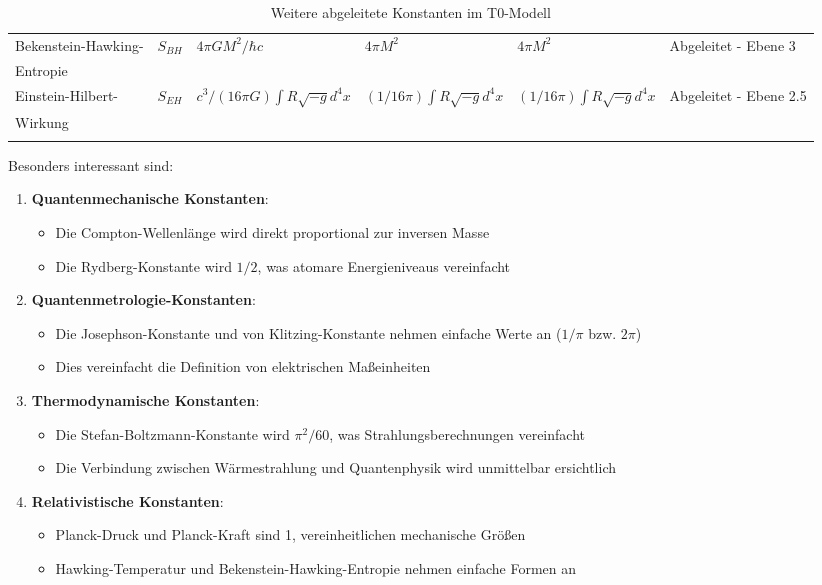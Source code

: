 \documentclass[12pt,a4paper]{article}
\begin{document}
\begin{table}[ht]
\begin{adjustbox}{scale=0.65}
\begin{tabular}{llllll}
				Bekenstein-Hawking- & $S_{BH}$ & $4\pi GM^2/\hbar c$ & $4\pi M^2$ & $4\pi M^2$ & Abgeleitet - Ebene 3 \\
				Entropie & & & & & \\
				Einstein-Hilbert- & $S_{EH}$ & $c^3/(16\pi G)\int R\sqrt{-g} d^4x$ & $(1/16\pi)\int R\sqrt{-g} d^4x$ & $(1/16\pi)\int R\sqrt{-g} d^4x$ & Abgeleitet - Ebene 2.5 \\
				Wirkung & & & & & \\
				\hline
				\multicolumn{5}{c}{} \\
				\hline
			\end{tabular}
		\end{adjustbox}
		\caption{Weitere abgeleitete Konstanten im T0-Modell}
		\label{tab:derived_const}
	\end{table}
	
	Besonders interessant sind:
	
	\begin{enumerate}
		\item \textbf{Quantenmechanische Konstanten}:
		\begin{itemize}
			\item Die Compton-Wellenlänge wird direkt proportional zur inversen Masse
			\item Die Rydberg-Konstante wird $1/2$, was atomare Energieniveaus vereinfacht
		\end{itemize}
		
		\item \textbf{Quantenmetrologie-Konstanten}:
		\begin{itemize}
			\item Die Josephson-Konstante und von Klitzing-Konstante nehmen einfache Werte an ($1/\pi$ bzw. $2\pi$)
			\item Dies vereinfacht die Definition von elektrischen Maßeinheiten
		\end{itemize}
		
		\item \textbf{Thermodynamische Konstanten}:
		\begin{itemize}
			\item Die Stefan-Boltzmann-Konstante wird $\pi^2/60$, was Strahlungsberechnungen vereinfacht
			\item Die Verbindung zwischen Wärmestrahlung und Quantenphysik wird unmittelbar ersichtlich
		\end{itemize}
		
		\item \textbf{Relativistische Konstanten}:
		\begin{itemize}
			\item Planck-Druck und Planck-Kraft sind 1, vereinheitlichen mechanische Größen
			\item Hawking-Temperatur und Bekenstein-Hawking-Entropie nehmen einfache Formen an
		\end{itemize}
	\end{enumerate}
	
\end{document}
